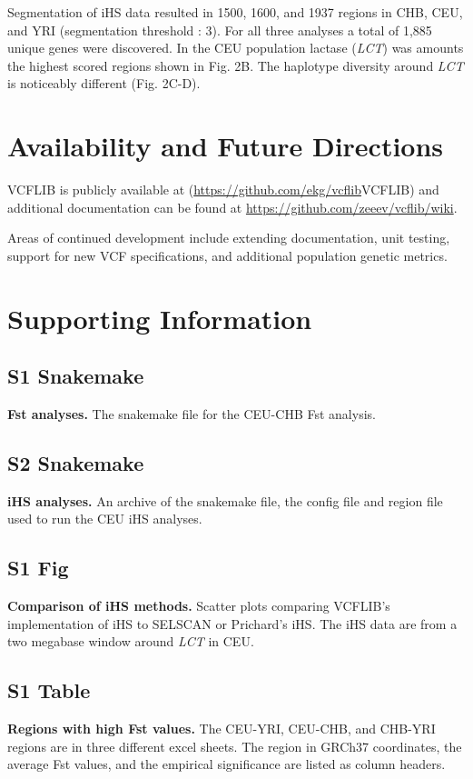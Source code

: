 \documentclass[10pt,letterpaper]{article}
\begin{document}
Segmentation of iHS data resulted in 1500, 1600, and 1937 regions in CHB, CEU, and YRI (segmentation threshold :  3).  For all three analyses a total of 1,885 unique genes were discovered.  In the CEU population lactase (\textit{LCT}) was amounts the highest scored regions shown in Fig. 2B.  The haplotype diversity around \textit{LCT} is noticeably different (Fig. 2C-D). 


\section*{Availability and Future Directions}

VCFLIB is publicly available at (\url{https://github.com/ekg/vcflib}{VCFLIB}) and additional documentation can be found at \url{https://github.com/zeeev/vcflib/wiki}.  

Areas of continued development include extending documentation, unit testing,  support for new VCF specifications, and additional population genetic metrics.



\section*{Supporting Information}

\subsection*{S1 Snakemake}
\label{S1_snakemake}
{\bf Fst analyses.}  The snakemake file for the CEU-CHB Fst analysis.  

\subsection*{S2 Snakemake}
\label{S2_snakemake}
{\bf iHS analyses.}  An archive of the snakemake file, the config file and region file used to run the CEU iHS analyses.

\subsection*{S1 Fig}
\label{S1_Fig}
{\bf Comparison of iHS methods.}  Scatter plots comparing VCFLIB's implementation of iHS to SELSCAN or Prichard's iHS. The iHS data are from a two megabase window around \textit{LCT} in CEU.

\subsection*{S1 Table}
\label{S1_Table}
{\bf Regions with high Fst values.} The CEU-YRI, CEU-CHB, and CHB-YRI regions are in three different excel sheets.  The region in GRCh37 coordinates, the average Fst values, and the empirical significance are listed as column headers.
\end{document}
